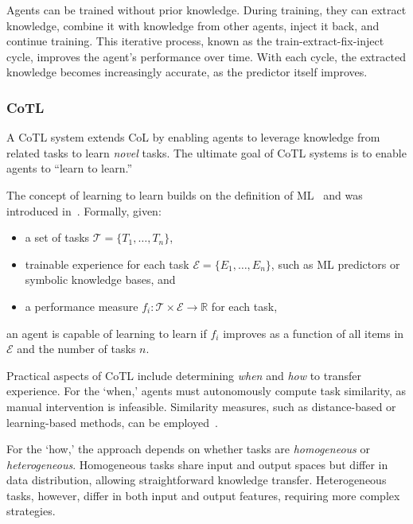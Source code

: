 Agents can be trained without prior knowledge.
%
During training, they can extract knowledge, combine it with knowledge from other agents, inject it back, and continue training.
%
This iterative process, known as the train-extract-fix-inject cycle, improves the agent's performance over time.
%
With each cycle, the extracted knowledge becomes increasingly accurate, as the predictor itself improves.


\subsubsection{\gls{CoTL}}
\label{subsubsec:cotl}
%
A \gls{CoTL} system extends \gls{CoL} by enabling agents to leverage knowledge from related tasks to learn \emph{novel} tasks.
%
The ultimate goal of \gls{CoTL} systems is to enable agents to ``learn to learn.''

The concept of learning to learn builds on the definition of \gls{ML}~\cite{DBLP:books/daglib/0087929} and was introduced in~\cite{learning-to-learn-thrun-1998}.
%
Formally, given:
%
\begin{itemize}
    \item a set of tasks \(\mathcal{T} = \{T_{1}, \dots, T_{n}\}\),
    \item trainable experience for each task \(\mathcal{E} = \{E_{1}, \dots, E_{n}\}\), such as \gls{ML} predictors or symbolic knowledge bases, and
    \item a performance measure \(f_i : \mathcal{T} \times \mathcal{E} \rightarrow \mathbb{R}\) for each task,
\end{itemize}
%
an agent is capable of learning to learn if \(f_i\) improves as a function of all items in \(\mathcal{E}\) and the number of tasks \(n\).

Practical aspects of \gls{CoTL} include determining \emph{when} and \emph{how} to transfer experience.
%
For the `when,' agents must autonomously compute task similarity, as manual intervention is infeasible.
%
Similarity measures, such as distance-based or learning-based methods, can be employed~\cite{multi-task-learning-caruana-1997}.

For the `how,' the approach depends on whether tasks are \emph{homogeneous} or \emph{heterogeneous}.
%
Homogeneous tasks share input and output spaces but differ in data distribution, allowing straightforward knowledge transfer.
%
Heterogeneous tasks, however, differ in both input and output features, requiring more complex strategies.

